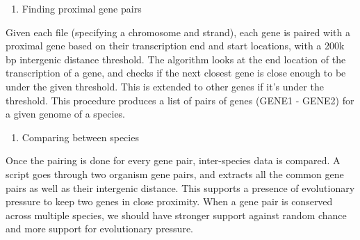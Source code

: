 \documentclass[
]{article}
\providecommand{\tightlist}{%
  \setlength{\itemsep}{0pt}\setlength{\parskip}{0pt}}
\begin{document}
\noindent{}

\begin{enumerate}
\def\labelenumi{\arabic{enumi}.}
\setcounter{enumi}{1}
\tightlist
\item
  Finding proximal gene pairs
\end{enumerate}

Given each file (specifying a chromosome and strand), each gene is
paired with a proximal gene based on their transcription end and start
locations, with a 200k bp intergenic distance threshold. The algorithm
looks at the end location of the transcription of a gene, and checks if
the next closest gene is close enough to be under the given threshold.
This is extended to other genes if it's under the threshold. This
procedure produces a list of pairs of genes (GENE1 - GENE2) for a given
genome of a species.

\noindent{}

\begin{enumerate}
\def\labelenumi{\arabic{enumi}.}
\setcounter{enumi}{2}
\tightlist
\item
  Comparing between species
\end{enumerate}

Once the pairing is done for every gene pair, inter-species data is
compared. A script goes through two organism gene pairs, and extracts
all the common gene pairs as well as their intergenic distance. This
supports a presence of evolutionary pressure to keep two genes in close
proximity. When a gene pair is conserved across multiple species, we
should have stronger support against random chance and more support for
evolutionary pressure.
\end{document}
